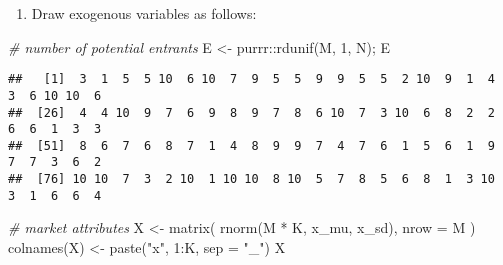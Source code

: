 \documentclass[
]{article}
\newenvironment{Shaded}{\begin{snugshade}}{\end{snugshade}}
\newcommand{\AttributeTok}[1]{\textcolor[rgb]{0.77,0.63,0.00}{#1}}
\newcommand{\CommentTok}[1]{\textcolor[rgb]{0.56,0.35,0.01}{\textit{#1}}}
\newcommand{\DecValTok}[1]{\textcolor[rgb]{0.00,0.00,0.81}{#1}}
\newcommand{\FunctionTok}[1]{\textcolor[rgb]{0.00,0.00,0.00}{#1}}
\newcommand{\NormalTok}[1]{#1}
\newcommand{\OtherTok}[1]{\textcolor[rgb]{0.56,0.35,0.01}{#1}}
\newcommand{\SpecialCharTok}[1]{\textcolor[rgb]{0.00,0.00,0.00}{#1}}
\newcommand{\StringTok}[1]{\textcolor[rgb]{0.31,0.60,0.02}{#1}}
\providecommand{\tightlist}{%
  \setlength{\itemsep}{0pt}\setlength{\parskip}{0pt}}
\begin{document}
\begin{enumerate}
\def\labelenumi{\arabic{enumi}.}
\setcounter{enumi}{2}
\tightlist
\item
  Draw exogenous variables as follows:
\end{enumerate}

\begin{Shaded}
\begin{Highlighting}[]
\CommentTok{\# number of potential entrants}
\NormalTok{E }\OtherTok{\textless{}{-}}\NormalTok{ purrr}\SpecialCharTok{::}\FunctionTok{rdunif}\NormalTok{(M, }\DecValTok{1}\NormalTok{, N); E}
\end{Highlighting}
\end{Shaded}

\begin{verbatim}
##   [1]  3  1  5  5 10  6 10  7  9  5  5  9  9  5  5  2 10  9  1  4  3  6 10 10  6
##  [26]  4  4 10  9  7  6  9  8  9  7  8  6 10  7  3 10  6  8  2  2  6  6  1  3  3
##  [51]  8  6  7  6  8  7  1  4  8  9  9  7  4  7  6  1  5  6  1  9  7  7  3  6  2
##  [76] 10 10  7  3  2 10  1 10 10  8 10  5  7  8  5  6  8  1  3 10  3  1  6  6  4
\end{verbatim}

\begin{Shaded}
\begin{Highlighting}[]
\CommentTok{\# market attributes}
\NormalTok{X }\OtherTok{\textless{}{-}} \FunctionTok{matrix}\NormalTok{(}
  \FunctionTok{rnorm}\NormalTok{(M }\SpecialCharTok{*}\NormalTok{ K, x\_mu, x\_sd),}
  \AttributeTok{nrow =}\NormalTok{ M}
\NormalTok{)}
\FunctionTok{colnames}\NormalTok{(X) }\OtherTok{\textless{}{-}} \FunctionTok{paste}\NormalTok{(}\StringTok{"x"}\NormalTok{, }\DecValTok{1}\SpecialCharTok{:}\NormalTok{K, }\AttributeTok{sep =} \StringTok{"\_"}\NormalTok{)}
\NormalTok{X}
\end{Highlighting}
\end{Shaded}
\end{document}
